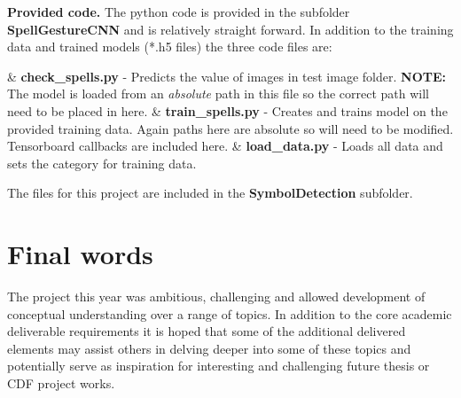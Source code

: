 \documentclass{article}
\begin{document}
\textbf{Provided code.} The python code is provided in the subfolder \textbf{SpellGestureCNN} and is relatively straight forward. In addition to the training data and trained models (*.h5 files) the three code files are:

\begin{easylist}[itemize]
	& \textbf{check\_spells.py} - Predicts the value of images in test image folder. \textbf{NOTE:} The model is loaded from an \textit{absolute} path in this file so the correct path will need to be placed in here.
	& \textbf{train\_spells.py} - Creates and trains model on the provided training data. Again paths here are absolute so will need to be modified. Tensorboard callbacks are included here.
	& \textbf{load\_data.py} - Loads all data and sets the category for training data.\\
\end{easylist}

The files for this project are included in the \textbf{SymbolDetection} subfolder.

\section*{Final words}
The project this year was ambitious, challenging and allowed development of conceptual understanding over a range of topics. In addition to the core academic deliverable requirements it is hoped that some of the additional delivered elements may assist others in delving deeper into some of these topics and potentially serve as inspiration for interesting and challenging future thesis or CDF project works. 
\end{document}
